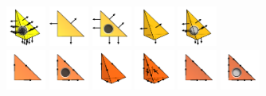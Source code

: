 \begin{frame}
  \includegraphics[width=1.3cm]{png/BDM2_3d.png}
  \includegraphics[width=1.3cm]{png/RT1_2d.png}
  \includegraphics[width=1.3cm]{png/RT2_2d.png}
  \includegraphics[width=1.3cm]{png/RT1_3d.png}
  \includegraphics[width=1.3cm]{png/RT2_3d.png} \\
  \includegraphics[width=1.3cm]{png/NED1_1_2d.png}
  \includegraphics[width=1.3cm]{png/NED1_2_2d.png}
  \includegraphics[width=1.3cm]{png/NED1_1_3d.png}
  \includegraphics[width=1.3cm]{png/NED1_2_3d.png}
  \includegraphics[width=1.3cm]{png/NED2_1_2d.png}
  \includegraphics[width=1.3cm]{png/NED2_2_2d.png}

\end{frame}
